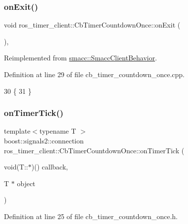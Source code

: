 \subsubsection{\texorpdfstring{on\+Exit()}{onExit()}}
{\footnotesize\ttfamily void ros\+\_\+timer\+\_\+client\+::\+Cb\+Timer\+Countdown\+Once\+::on\+Exit (\begin{DoxyParamCaption}{ }\end{DoxyParamCaption})\hspace{0.3cm}{\ttfamily [override]}, {\ttfamily [virtual]}}



Reimplemented from \hyperlink{classsmacc_1_1SmaccClientBehavior_ac0cd72d42bd00425362a97c9803ecce5}{smacc\+::\+Smacc\+Client\+Behavior}.



Definition at line 29 of file cb\+\_\+timer\+\_\+countdown\+\_\+once.\+cpp.


\begin{DoxyCode}
30 \{
31 \}
\end{DoxyCode}
\mbox{\label{classros__timer__client_1_1CbTimerCountdownOnce_a38949571cf20ca88b4a1bac881399f21}} 
\subsubsection{\texorpdfstring{on\+Timer\+Tick()}{onTimerTick()}}
{\footnotesize\ttfamily template$<$typename T $>$ \\
boost\+::signals2\+::connection ros\+\_\+timer\+\_\+client\+::\+Cb\+Timer\+Countdown\+Once\+::on\+Timer\+Tick (\begin{DoxyParamCaption}\item[{void(T\+::$\ast$)()}]{callback,  }\item[{T $\ast$}]{object }\end{DoxyParamCaption})\hspace{0.3cm}{\ttfamily [inline]}}



Definition at line 25 of file cb\+\_\+timer\+\_\+countdown\+\_\+once.\+h.




